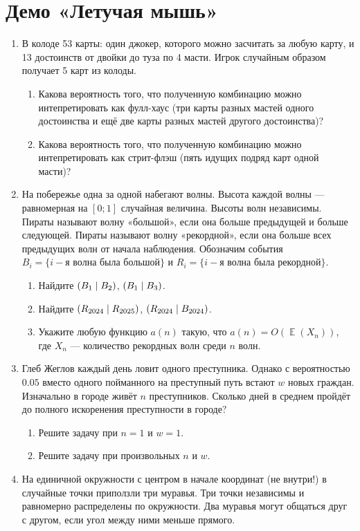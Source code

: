 \documentclass[12pt]{article}
\let\P\relax
\DeclareMathOperator{\P}{\mathbb{P}}
\DeclareMathOperator{\E}{\mathbb{E}}
\begin{document}
\section*{Демо «Летучая мышь»}
\begin{enumerate}
    \item %
    В колоде 53 карты: один джокер, которого можно засчитать за любую карту, и 13 достоинств от двойки до туза по 4 масти. 
    Игрок случайным образом получает 5 карт из колоды.

    \begin{enumerate}
        \item Какова вероятность того, что полученную комбинацию можно интепретировать как фулл-хаус (три карты разных мастей одного достоинства и ещё две карты разных мастей другого достоинства)?
        \item Какова вероятность того, что полученную комбинацию можно интепретировать как стрит-флэш (пять идущих подряд карт одной масти)?
    \end{enumerate}
    
    \item %
   На побережье одна за одной набегают волны. 
   Высота каждой волны — равномерная на $[0; 1]$ случайная величина. 
   Высоты волн независимы. 
   Пираты называют волну «большой», если она больше предыдущей и больше следующей. 
   Пираты называют волну «рекордной», если она больше всех предыдущих волн от начала наблюдения. 
   Обозначим события $B_i = \{i-\text{я волна была большой}\}$ и $R_i = \{i-\text{я волна была рекордной}\}$.
   
   \begin{enumerate}
    \item Найдите $\P(B_1 \mid B_2)$, $\P(B_1 \mid B_3)$.
    \item Найдите $\P(R_{2024} \mid R_{2025})$, $\P(R_{2024} \mid B_{2024})$.
    \item Укажите любую функцию $a(n)$ такую, что $a(n) = O(\E(X_n))$, где $X_n$ — количество рекордных волн среди $n$ волн. 
   \end{enumerate}

    \item %
    Глеб Жеглов каждый день ловит одного преступника. 
    Однако с вероятностью $0.05$ вместо одного пойманного на преступный путь встают $w$ новых граждан. 
    Изначально в городе живёт $n$ преступников.
    Сколько дней в среднем пройдёт до полного искоренения преступности в городе?
    \begin{enumerate}
        \item Решите задачу при $n = 1$ и $w = 1$.
        \item Решите задачу при произвольных $n$ и $w$.
    \end{enumerate}
    \item %
    На единичной окружности с центром в начале координат (не внутри!) в случайные точки приползли три муравья.
    Три точки  независимы и равномерно распределены по окружности. 
    Два муравья могут общаться друг с другом, если угол между ними меньше прямого. 


\end{enumerate}
\end{document}
